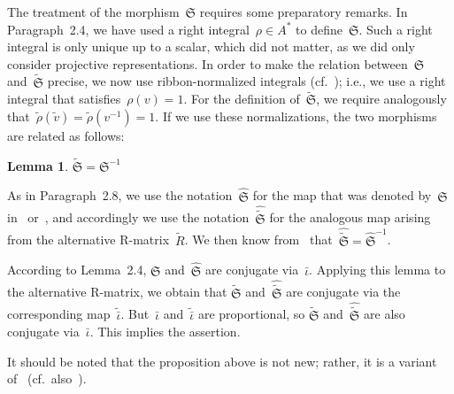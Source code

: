 \documentclass[12pt]{article}
\makeatletter
\theoremstyle{definition}
\newtheorem{Lemma}[Satz]{Lemma}
\theoremstyle{break}
\renewenvironment{proof}[1][\proofname]{\par
\vspace{-5pt}%
\pushQED{\qed}%
\normalfont
\topsep0pt \partopsep0pt %
\trivlist
\item[\hskip\labelsep
\bfseries
#1\@addpunct{.}]\ignorespaces
}{%
\popQED\endtrivlist\@endpefalse
\addvspace{6pt plus 6pt} %
}
\newcommand{\fS}{\mathfrak{S}}
\renewcommand{\1}{\mathbbm{1}}
\makeatother
\begin{document}
The treatment of the morphism~$\fS$ requires some preparatory remarks. In Paragraph~2.4, we have used a right integral~$\rho \in A^*$ to define~$\fS$. Such a right integral is only unique up to a scalar, which did not matter, as we did only consider projective representations. In order to make the relation between~$\fS$ and~$\tilde{\fS}$ precise, we now use ribbon-normalized integrals (cf.~\cite[Def.~4.4, p.~39]{SZ}); i.e., we use a right integral that satisfies~$\rho(v) = 1$. For the definition of~$\tilde{\fS}$, we require analogously that~$\tilde{\rho}(\tilde{v}) = \tilde{\rho}(v^{-1}) = 1$. If we use these normalizations, the two morphisms are related as follows:
\begin{Lemma} \label{LemAltRMat}
$\tilde{\fS} = \fS^{-1}$
\end{Lemma}
\begin{proof}
As in Paragraph~2.8, we use the notation~$\hat{\fS}$ for the map that was denoted by~$\fS$ in~\cite[Sec.~3, p.~410]{LMSS1} or~\cite[Par.~4.1, p.~35]{SZ}, and accordingly we use the notation~$\hat{\tilde{\fS}}$ for the analogous map arising from the alternative R-matrix~$\tilde{R}$. We then know from~\cite[Par.~4.4, p.~40]{SZ} that~$\hat{\tilde{\fS}} = \hat{\fS}^{-1}$.

According to Lemma~2.4, $\fS$ and~$\hat{\fS}$ are conjugate via~$\bar{\iota}$. Applying this lemma to the alternative R-matrix, we obtain that $\tilde{\fS}$ and~$\hat{\tilde{\fS}}$ are conjugate via the corresponding map~$\tilde{\bar{\iota}}$. But~$\bar{\iota}$ and~$\tilde{\bar{\iota}}$ are proportional, so $\tilde{\fS}$ and~$\hat{\tilde{\fS}}$ are also conjugate via~$\bar{\iota}$. This implies the assertion.
\end{proof}

It should be noted that the proposition above is not new; rather, it is a variant of~\cite[Thm.~6.10, p.~323]{Ly} (cf.~also~\cite[Thm.~4.4, p.~523]{LM}).
\end{document}
